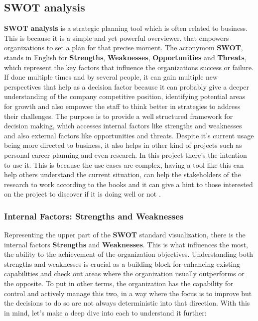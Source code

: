 %
%
%
%
\subsection{SWOT analysis}
\textbf{SWOT analysis} is a strategic planning tool which is often related to business. This is because it is a simple and yet powerful overviewer, that empowers organizations to set a plan for that precise moment. The acronymom \textbf{SWOT}, stands in English for \textbf{Strengths}, \textbf{Weaknesses}, \textbf{Opportunities} and \textbf{Threats}, which represent the key factors that influence the organizations success or failure. If done multiple times and by several people, it can gain multiple new perspectives that help as a decision factor because it can probably give a deeper understanding of the company competitive position, identifying potential areas for growth and also empower the staff to think better in strategies to address their challenges.
The purpose is to provide a well structured framework for decision making, which accesses internal factors like strengths and weaknesses and also external factors like opportunities and threats.
Despite it's current usage being more directed to business, it also helps in other kind of projects such as personal career planning and even research. In this project there's the intention to use it. This is because the use cases are complex, having a tool like this can help others understand the current situation, can help the stakeholders of the research to work according to the books and it can give a hint to those interested on the project to discover if it is doing well or not \cite{swot}.  

\subsubsection{Internal Factors: Strengths and Weaknesses}
Representing the upper part of the \textbf{SWOT} standard visualization, there is the internal factors \textbf{Strengths} and \textbf{Weaknesses}. This is what influences the most, the ability to the achievement of the organization objectives. Understanding both strengths and weaknesses is crucial as a building block for enhancing existing capabilities and check out areas where the organization usually outperforms or the opposite. To put in other terms, the organization has the capability for control and actively manage this two, in a way where the focus is to improve but the decisions to do so are not always deterministic into that direction. With this in mind, let's make a deep dive into each to understand it further:

